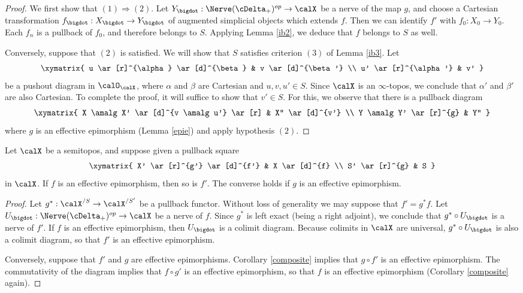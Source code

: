 \begin{proof}
We first show that $(1) \Rightarrow (2)$. 
Let $Y_{\bigdot}: \Nerve(\cDelta_{+})^{op} \rightarrow \calX$ be a \Cech nerve of
the map $g$, and choose a Cartesian transformation $f_{\bigdot}: X_{\bigdot} \rightarrow Y_{\bigdot}$ of augmented simplicial objects which extends $f$. Then we can identify
$f'$ with $f_{0}: X_0 \rightarrow Y_0$. Each $f_n$ is a pullback of $f_0$, and therefore belongs to $S$. Applying Lemma \ref{ib2}, we deduce that $f$ belongs to $S$ as well.

Conversely, suppose that $(2)$ is satisfied. We will show that $S$ satisfies criterion $(3)$ of Lemma \ref{ib3}. Let $$ \xymatrix{ u \ar[r]^{\alpha} \ar[d]^{\beta} & v \ar[d]^{\beta'} \\
u' \ar[r]^{\alpha'} & v' }$$
be a pushout diagram in $\calO_{\calX}$, where $\alpha$ and $\beta$ are Cartesian
and $u,v,u' \in S$. Since $\calX$ is an $\infty$-topos, we conclude that $\alpha'$ and $\beta'$ are also Cartesian. To complete the proof, it will suffice to show that $v' \in S$. For this, we observe that
there is a pullback diagram
$$ \xymatrix{ X \amalg X' \ar[d]^{v \amalg u'} \ar[r] & X'' \ar[d]^{v'} \\
Y \amalg Y' \ar[r]^{g} & Y'' }$$
where $g$ is an effective epimorphism (Lemma \ref{epie}) and apply hypothesis $(2)$.
\end{proof}


\begin{proposition}\label{hintdescent1}
Let $\calX$ be a semitopos, and suppose given a pullback square
$$ \xymatrix{ X' \ar[r]^{g'} \ar[d]^{f'} & X \ar[d]^{f} \\
S' \ar[r]^{g} & S }$$
in $\calX$. If $f$ is an effective epimorphism, then so is $f'$. 
The converse holds if $g$ is an effective epimorphism.
\end{proposition}

\begin{proof}
Let $g^{\ast}: \calX^{/S} \rightarrow \calX^{/S'}$ be a pullback functor. Without loss of 
generality we may suppose that $f' = g^{\ast} f$. 
Let $U_{\bigdot}: \Nerve(\cDelta_{+})^{op} \rightarrow \calX$ be a \Cech nerve of $f$.
Since $g^{\ast}$ is left exact (being a right adjoint), we conclude that
$g^{\ast} \circ U_{\bigdot}$ is a \Cech nerve of $f'$. If $f$ is an effective epimorphism, then
$U_{\bigdot}$ is a colimit diagram. Because colimits in $\calX$ are universal, $g^{\ast} \circ U_{\bigdot}$ is also a colimit diagram, so that $f'$ is an effective epimorphism.

Conversely, suppose that $f'$ and $g$ are effective epimorphisms. Corollary \ref{composite} implies that $g \circ f'$ is an effective epimorphism. The commutativity of the diagram
implies that $f \circ g'$ is an effective epimorphism, so that $f$ is an effective epimorphism (Corollary \ref{composite} again).
\end{proof}

